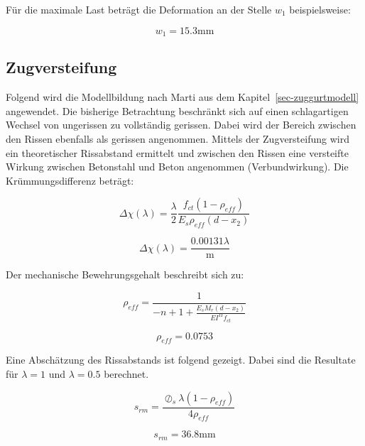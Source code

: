 \documentclass[
  12pt,
  letterpaper,
  egregdoesnotlikesansseriftitles]{scrreprt}
\begin{document}
Für die maximale Last beträgt die Deformation an der Stelle \(w_1\)
beispielsweise:

\begin{equation}w_{1} = 15.3 \text{mm}\end{equation}

\hypertarget{zugversteifung}{%
\subsection{Zugversteifung}\label{zugversteifung}}

Folgend wird die Modellbildung nach Marti aus dem
Kapitel~\ref{sec-zuggurtmodell} angewendet. Die bisherige Betrachtung
beschränkt sich auf einen schlagartigen Wechsel von ungerissen zu
vollständig gerissen. Dabei wird der Bereich zwischen den Rissen
ebenfalls als gerissen angenommen. Mittels der Zugversteifung wird ein
theoretischer Rissabstand ermittelt und zwischen den Rissen eine
versteifte Wirkung zwischen Betonstahl und Beton angenommen
(Verbundwirkung). Die Krümmungsdifferenz beträgt:

\begin{equation}\Delta\chi{\left(\lambda \right)} = \frac{\lambda}{2} \frac{f_{ct} \left(1 - \rho_{eff}\right)}{E_{s} \rho_{eff} \left(d - x_{2}\right)}\end{equation}

\begin{equation}\Delta\chi{\left(\lambda \right)} = \frac{0.00131 \lambda}{\text{m}}\end{equation}

Der mechanische Bewehrungsgehalt beschreibt sich zu:

\begin{equation}\rho_{eff} = \frac{1}{- n + 1 + \frac{E_{s} M_{r} \left(d - x_{2}\right)}{EI^{II} f_{ct}}}\end{equation}

\begin{equation}\rho_{eff} = 0.0753\end{equation}

Eine Abschätzung des Rissabstands ist folgend gezeigt. Dabei sind die
Resultate für \(\lambda = 1\) und \(\lambda = 0.5\) berechnet.

\begin{equation}s_{rm} = \frac{\oslash_{s} \lambda \left(1 - \rho_{eff}\right)}{4 \rho_{eff}}\end{equation}

\begin{equation}s_{rm} = 36.8 \text{mm}\end{equation}
\end{document}
